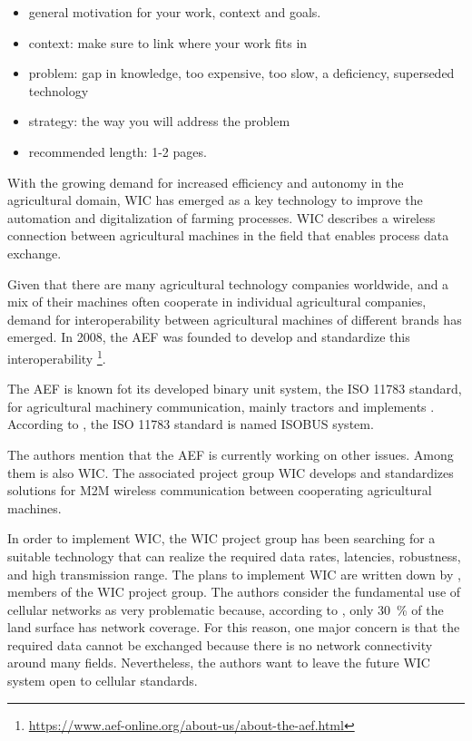 \begin{itemize}
\item general motivation for your work, context and goals.
\item context: make sure to link where your work fits in
\item problem: gap in knowledge, too expensive, too slow, a deficiency, superseded technology
\item strategy: the way you will address the problem
\item recommended length: 1-2 pages.
\end{itemize}
With the growing demand for increased efficiency and autonomy in the agricultural domain, \ac{WIC} has emerged as a key technology to improve the automation
and digitalization of farming processes. \ac{WIC} describes a wireless connection between agricultural machines
in the field that enables process data exchange.

Given that there are many agricultural technology companies worldwide, and a mix of their machines often cooperate in individual agricultural companies, demand for interoperability between agricultural machines of different brands
has emerged.
In 2008, the \ac{AEF} was founded to develop and standardize this interoperability
\footnote{\url{https://www.aef-online.org/about-us/about-the-aef.html}}.

The AEF is known fot its developed binary unit system, the ISO 11783 standard, for agricultural machinery communication, mainly tractors and
implements \cite{iglesias_enabling_2014}.
According to \textcite{schlingmann_aef_2019}, the ISO 11783 standard is named ISOBUS system.

The authors mention that the AEF is currently working on other issues.
Among them is also \ac{WIC}.
The associated project group \ac{WIC} develops and standardizes solutions for \ac{M2M} wireless
communication between cooperating agricultural machines.

In order to implement \ac{WIC}, the \ac{WIC} project group has been searching for a suitable technology
that can realize the required data rates, latencies, robustness, and high transmission range.
The plans to implement \ac{WIC} are written down by \textcite{schlingmann_challenges_2017}, members of the \ac{WIC} project group.
The authors consider the fundamental use of cellular networks as very problematic
because, according to \cite{itu2016facts}, only \SI{30}{\percent} of the land surface has network coverage.
For this reason, one major concern is that the required data cannot be exchanged because there is
no network connectivity around many fields.
Nevertheless, the authors want to leave the future \ac{WIC} system open
to cellular standards.


